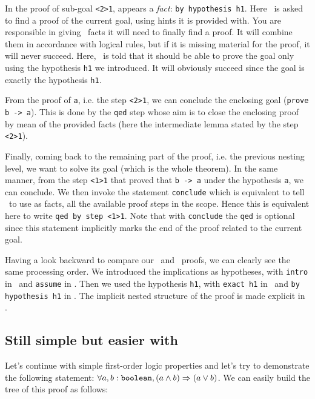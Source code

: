 \medskip
In the proof of sub-goal \lstinline"<2>1", appears a {\em fact}:
\lstinline"by hypothesis h1". Here \zenon\ is asked to find a proof of
the current goal, using hints it is provided with. You are responsible
in giving \zenon\ facts it will need to finally find a proof. It will
combine them in accordance with logical rules, but if it is missing
material for the proof, it will never succeed. Here, \zenon\ is told
that it should be able to prove the goal only using the hypothesis
\lstinline"h1" we introduced. It will obviously succeed since the goal
is exactly the hypothesis \lstinline"h1".

From the proof of \lstinline"a", i.e. the step \lstinline"<2>1", we can conclude the
en\-clo\-sing goal (\lstinline"prove b -> a"). This is done by the \lstinline"qed"
step whose aim is to close the enclosing proof by mean of the provided
facts (here the intermediate lemma stated by the step \lstinline"<2>1").

Finally, coming back to the remaining part of the proof, i.e. the
previous nesting level, we want to solve its goal (which is the whole
theorem). In the same manner, from the step \lstinline"<1>1" that proved
that \lstinline"b -> a" under the hypothesis \lstinline"a", we can conclude. We
then invoke the statement \lstinline"conclude" which is equivalent to
tell \zenon\ to use as facts, all the available proof steps in the
scope. Hence this is equivalent here to write
\lstinline"qed by step <1>1". Note that with \lstinline"conclude" the
\lstinline"qed" is optional since this statement implicitly marks the
end of the proof related to the current goal.

Having a look backward to compare our \coq\ and \focal\ proofs, we can
clearly see the same processing order. We introduced the implications as
hypotheses, with \verb"intro" in \coq\ and \lstinline"assume" in
\focal. Then we used the hypothesis \lstinline"h1", with \verb"exact h1" in 
\coq\ and \lstinline"by hypothesis h1" in \focal. The implicit nested
structure of the proof is made explicit in \focal.



\subsection{Still simple but easier with \zenon}
Let's continue with simple first-order logic properties and let's try
to demonstrate the following statement:
$\forall a, b : {\tt boolean}, (a \wedge b) \Rightarrow (a \vee b)$.
We can easily build the tree of this proof as follows:

